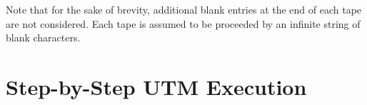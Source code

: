 

\vspace{1cm}
Note that for the sake of brevity, additional blank entries at the end of each tape are not considered. Each tape is assumed to be proceeded by an infinite string of blank characters.

\newpage

\section*{Step-by-Step UTM Execution}


